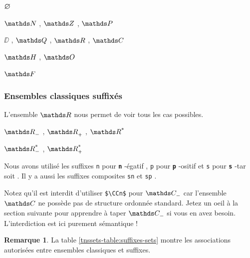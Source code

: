 \documentclass[12pt,a4paper]{book}
\makeatletter
\theoremstyle{definition}
\newtheorem*{remark}{Remarque}
\newcommand\whyprefix[2]{%
	\textbf{\prefix{#1}}-#2%
}
\newcommand\prefix[1]{%
	\texttt{#1}%
}
\newcommand\inenglish{\@ifstar{\@inenglish@star}{\@inenglish@no@star}}
\newcommand\@inenglish@star[1]{%
	\emph{\og #1 \fg}%
}
\newcommand\@inenglish@no@star[1]{%
	\@inenglish@star{#1} en anglais%
}
\makeatother
\begin{document}
{{\begin{latexex}
$\nullset$

$\NN$ , $\ZZ$ , $\PP$

$\DD$ , $\QQ$ , $\RR$ , $\CC$

$\HH$ , $\OO$

$\FF$
\end{latexex}




\subsubsection{Ensembles classiques suffixés}

L'ensemble $\RR$ nous permet de voir tous les cas possibles.

\begin{latexex}
$\RRn$ , $\RRp$ , $\RRs$

$\RRsn$ , $\RRsp$
\end{latexex}


Nous avons utilisé les suffixes \prefix{n} pour \whyprefix{n}{égatif}, \prefix{p} pour \whyprefix{p}{ositif} et \prefix{s} pour \whyprefix{s}{tar} soit \inenglish{étoile}. Il y a aussi les suffixes composites \prefix{sn} et \prefix{sp}.

\medskip

Notez qu'il est interdit d'utiliser \verb+$\CCn$+ pour $\setspecial{\CC}{n}$ car l'ensemble $\CC$ ne possède pas de structure ordonnée standard. Jetez un oeil à la section suivante pour apprendre à taper $\setspecial{\CC}{n}$ si vous en avez besoin. L'interdiction est ici purement sémantique !

\medskip

\begin{remark}
	La table \ref{tnssets-table:suffixes-sets}  montre les associations autorisées entre ensembles classiques et suffixes.
\end{remark}


}}
\end{document}
